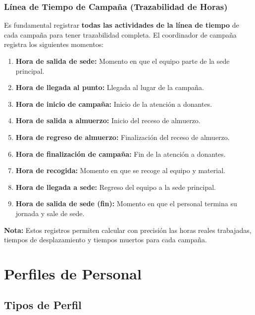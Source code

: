 \documentclass[10pt,a4paper]{article}
\begin{document}
\subsubsection{L\'{i}nea de Tiempo de Campaña (Trazabilidad de Horas)}

Es fundamental registrar \textbf{todas las actividades de la l\'{i}nea de tiempo} de cada campaña para tener trazabilidad completa. El coordinador de campaña registra los siguientes momentos:

\begin{enumerate}[leftmargin=2em]
    \item \textbf{Hora de salida de sede:} Momento en que el equipo parte de la sede principal.
    \item \textbf{Hora de llegada al punto:} Llegada al lugar de la campaña.
    \item \textbf{Hora de inicio de campaña:} Inicio de la atenci\'{o}n a donantes.
    \item \textbf{Hora de salida a almuerzo:} Inicio del receso de almuerzo.
    \item \textbf{Hora de regreso de almuerzo:} Finalizaci\'{o}n del receso de almuerzo.
    \item \textbf{Hora de finalizaci\'{o}n de campaña:} Fin de la atenci\'{o}n a donantes.
    \item \textbf{Hora de recogida:} Momento en que se recoge al equipo y material.
    \item \textbf{Hora de llegada a sede:} Regreso del equipo a la sede principal.
    \item \textbf{Hora de salida de sede (fin):} Momento en que el personal termina su jornada y sale de sede.
\end{enumerate}

\textbf{Nota:} Estos registros permiten calcular con precisi\'{o}n las horas reales trabajadas, tiempos de desplazamiento y tiempos muertos para cada campaña.

\section{Perfiles de Personal}

\subsection{Tipos de Perfil}
\end{document}
